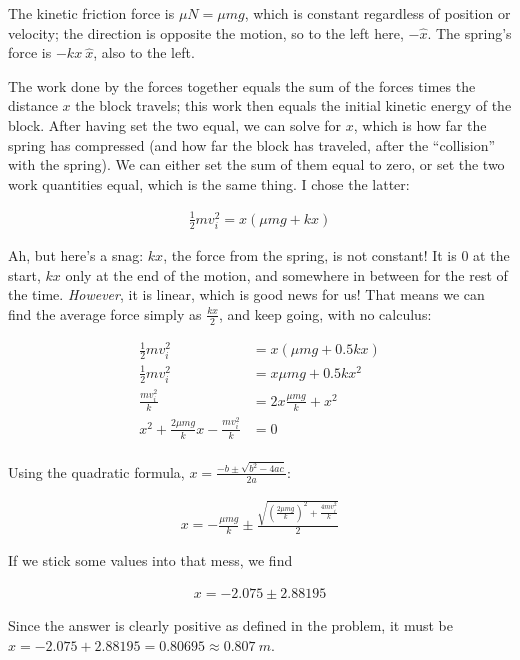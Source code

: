 \documentclass[8.01x]{subfiles}
\begin{document}
The kinetic friction force is $\mu N = \mu m g$, which is constant regardless of position or velocity; the direction is opposite the motion, so to the left here, $-\hat{x}$. The spring's force is $-k x\ \hat{x}$, also to the left.

The work done by the forces together equals the sum of the forces times the distance $x$ the block travels; this work then equals the initial kinetic energy of the block. After having set the two equal, we can solve for $x$, which is how far the spring has compressed (and how far the block has traveled, after the ``collision'' with the spring). We can either set the sum of them equal to zero, or set the two work quantities equal, which is the same thing. I chose the latter:

\begin{align}
\frac{1}{2} m v_i^2 = x \left(\mu m g + k x\right)
\end{align}

Ah, but here's a snag: $k x$, the force from the spring, is not constant! It is 0 at the start, $k x$ only at the end of the motion, and somewhere in between for the rest of the time. \emph{However}, it is linear, which is good news for us! That means we can find the average force simply as $\frac{k x}{2}$, and keep going, with no calculus:

\begin{align}
\frac{1}{2} m v_i^2 &= x \left(\mu m g + 0.5 k x\right)\\
\frac{1}{2} m v_i^2 &= x \mu m g + 0.5 k x^2\\
\frac{m v_i^2}{k} &= 2 x \frac{\mu m g}{k} + x^2\\
x^2 + \frac{2\mu m g}{k} x - \frac{m v_i^2}{k} &= 0\\
\end{align}

Using the quadratic formula, $\displaystyle x = \frac{-b \pm \sqrt{b^2 - 4 a c}}{2a}$:

\begin{align}
x = -\frac{\mu m g}{k} \pm \frac{\sqrt{\left(\frac{2 \mu m g}{k}\right)^2 + \frac{4 m v_i^2}{k}}}{2}
\end{align}

If we stick some values into that mess, we find

\begin{align}
x = -2.075 \pm 2.88195
\end{align}

Since the answer is clearly positive as defined in the problem, it must be $x = -2.075 + 2.88195 = 0.80695 \approx \SI{0.807}{m}$.
\end{document}
